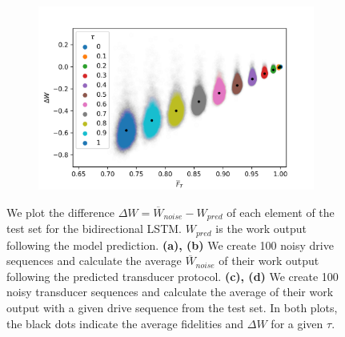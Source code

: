 \begin{figure}
\begin{subfigure}{0.4\textwidth}
	\end{subfigure}
	\begin{subfigure}{0.4\textwidth}
		\centering
		\includegraphics[width=\textwidth]{img/noisy_trans_dt_1}
	\end{subfigure}
	\caption{We plot the difference $\Delta W = \overline{W}_{noise} - W_{pred}$ of each element of the test set for the bidirectional LSTM. $W_{pred}$ is the work output following the model prediction. \textbf{(a), (b)} We create 100 noisy drive sequences and calculate the average $\overline{W}_{noise}$ of their work output following the predicted transducer protocol. \textbf{(c), (d)} We create 100 noisy transducer sequences and calculate the average of their work output with a given drive sequence from the test set. In both plots, the black dots indicate the average fidelities and $\Delta W$ for a given $\tau$.}
	\label{noisedt5}
\end{figure}